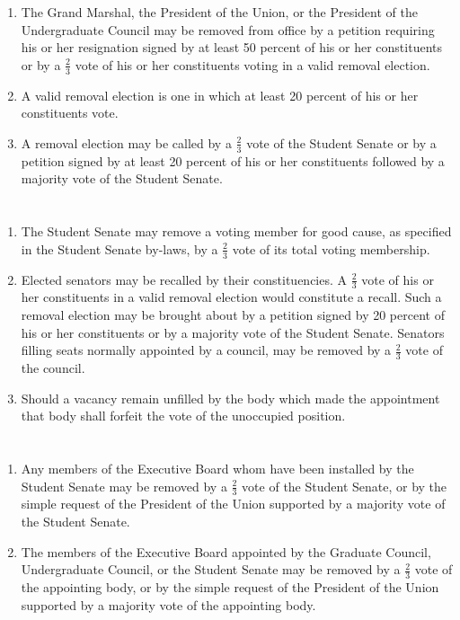 \section{}
\begin{enumerate}
\item The Grand Marshal, the President of the Union, or the President of the Undergraduate Council
may be removed from office by a petition requiring his or her resignation signed by at least 50
percent of his or her constituents or by a $\frac{2}{3}$ vote of his or her constituents voting in a valid
removal election.
\item A valid removal election is one in which at least 20 percent of his or her constituents vote.
\item A removal election may be called by a $\frac{2}{3}$ vote of the Student Senate or by a petition signed by
at least 20 percent of his or her constituents followed by a majority vote of the Student Senate.
\end{enumerate}

\section{}
\begin{enumerate}
\item The Student Senate may remove a voting member for good cause, as specified in the Student
Senate by-laws, by a $\frac{2}{3}$ vote of its total voting membership.
\item Elected senators may be recalled by their constituencies. A $\frac{2}{3}$ vote of his or her constituents in
a valid removal election would constitute a recall. Such a removal election may be brought
about by a petition signed by 20 percent of his or her constituents or by a majority vote of the
Student Senate. Senators filling seats normally appointed by a council, may be removed by a
$\frac{2}{3}$ vote of the council.
\item Should a vacancy remain unfilled by the body which made the appointment that body shall
forfeit the vote of the unoccupied position.
\end{enumerate}

\section{}
\begin{enumerate}
\item Any members of the Executive Board whom have been installed by the Student Senate may be
removed by a $\frac{2}{3}$ vote of the Student Senate, or by the simple request of the President of the
Union supported by a majority vote of the Student Senate.
\item The members of the Executive Board appointed by the Graduate Council, Undergraduate
Council, or the Student Senate may be removed by a $\frac{2}{3}$ vote of the appointing body, or by the
simple request of the President of the Union supported by a majority vote of the appointing
body.
\end{enumerate}

